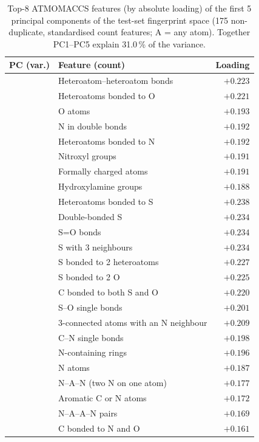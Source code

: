 \begin{table}[htbp]
\centering
\small
\caption{Top-8 ATMOMACCS features (by absolute loading) of the first 5 principal components of the test-set fingerprint space (175 non-duplicate, standardised count features; A = any atom). Together PC1--PC5 explain 31.0\,\% of the variance.}
\label{tab:pca_loadings}
\begin{tabular}{l p{} r}
\toprule
PC (var.) & Feature (count) & Loading \\
\midrule
{} & Heteroatom--heteroatom bonds & $+0.223$ \\
 & Heteroatoms bonded to O & $+0.221$ \\
 & O atoms & $+0.193$ \\
 & N in double bonds & $+0.192$ \\
 & Heteroatoms bonded to N & $+0.192$ \\
 & Nitroxyl groups & $+0.191$ \\
 & Formally charged atoms & $+0.191$ \\
 & Hydroxylamine groups & $+0.188$ \\
\midrule
{} & Heteroatoms bonded to S & $+0.238$ \\
 & Double-bonded S & $+0.234$ \\
 & S=O bonds & $+0.234$ \\
 & S with 3 neighbours & $+0.234$ \\
 & S bonded to 2 heteroatoms & $+0.227$ \\
 & S bonded to 2 O & $+0.225$ \\
 & C bonded to both S and O & $+0.220$ \\
 & S--O single bonds & $+0.201$ \\
\midrule
{} & 3-connected atoms with an N neighbour & $+0.209$ \\
 & C--N single bonds & $+0.198$ \\
 & N-containing rings & $+0.196$ \\
 & N atoms & $+0.187$ \\
 & N--A--N (two N on one atom) & $+0.177$ \\
 & Aromatic C or N atoms & $+0.172$ \\
 & N--A--A--N pairs & $+0.169$ \\
 & C bonded to N and O & $+0.161$ \\

\end{tabular}
\end{table}
